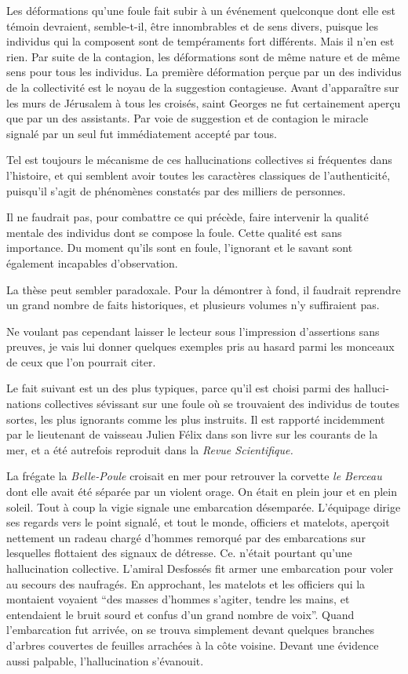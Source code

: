 \documentclass[french,twoside]{book} %
\begin{document}
Les déformations qu’une foule fait subir à un événement quelconque dont elle est témoin devraient, semble-t-il, être innombrables et de sens divers, puis­que les individus qui la composent sont de tempéraments fort différents. Mais il n’en est rien. Par suite de la contagion, les déformations sont de même nature et de même sens pour tous les individus. La première déformation perçue par un des individus de la collectivité est le noyau de la suggestion contagieuse. Avant d’apparaître sur les murs de Jérusalem à tous les croisés, saint Georges ne fut certainement aperçu que par un des assis­tants. Par voie de suggestion et de contagion le miracle signalé par un seul fut immédiatement accepté par tous.\par
Tel est toujours le mécanisme de ces hallucinations collectives si fréquentes dans l’histoire, et qui semblent avoir toutes les caractères classiques de l’authenticité, puisqu’il s’agit de phénomènes constatés par des milliers de personnes.\par
Il ne faudrait pas, pour combattre ce qui précède, faire intervenir la qualité mentale des individus dont se compose la foule. Cette qualité est sans importance. Du moment qu’ils sont en foule, l’ignorant et le savant sont également incapables d’obser­vation.\par
La thèse peut sembler paradoxale. Pour la démontrer à fond, il faudrait reprendre un grand nombre de faits historiques, et plusieurs volumes n’y suffiraient pas.\par
Ne voulant pas cependant laisser le lecteur sous l’impression d’assertions sans preuves, je vais lui donner quelques exemples pris au hasard parmi les monceaux de ceux que l’on pourrait citer.\par
Le fait suivant est un des plus typiques, parce qu’il est choisi parmi des halluci­nations collectives sévissant sur une foule où se trouvaient des individus de toutes sortes, les plus ignorants comme les plus instruits. Il est rapporté incidemment par le lieutenant de vaisseau Julien Félix dans son livre sur les courants de la mer, et a été autrefois reproduit dans la \emph{Revue Scientifique.}\par
La frégate la \emph{Belle-Poule} croisait en mer pour retrouver la corvette \emph{le Berceau} dont elle avait été séparée par un violent orage. On était en plein jour et en plein soleil. Tout à coup la vigie signale une embarcation désemparée. L’équipage dirige ses regards vers le point signalé, et tout le monde, officiers et matelots, aperçoit nettement un radeau chargé d’hommes remorqué par des embarcations sur lesquelles flottaient des signaux de détresse. Ce. n’était pourtant qu’une hallucination collective. L’amiral Desfossés fit armer une embarcation pour voler au secours des naufragés. En approchant, les matelots et les officiers qui la montaient voyaient “des masses d’hommes s’agiter, tendre les mains, et entendaient le bruit sourd et confus d’un grand nombre de voix”. Quand l’embarcation fut arrivée, on se trouva simplement devant quelques branches d’arbres couvertes de feuilles arrachées à la côte voisine. Devant une évidence aussi palpable, l’hallucination s’évanouit.\par
\end{document}
